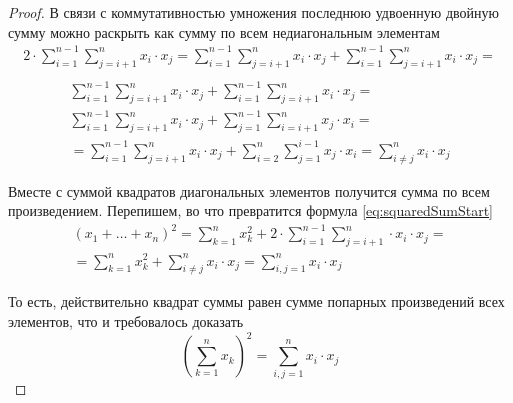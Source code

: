 \begin{proof}
    В связи с коммутативностью умножения последнюю удвоенную двойную сумму можно
    раскрыть как сумму по всем недиагональным элементам
    \begin{align*}
        2 \cdot \sum_{i=1}^{n-1} \sum_{j=i+1}^n x_i \cdot x_j
            = \sum_{i=1}^{n-1} \sum_{j=i+1}^n x_i \cdot x_j
                + \sum_{i=1}^{n-1} \sum_{j=i+1}^n x_i \cdot x_j = \\
    \end{align*}
    \begin{align*}
            \sum_{i=1}^{n-1} \sum_{j=i+1}^n x_i \cdot x_j
                + \sum_{i=1}^{n-1} \sum_{j=i+1}^n x_i \cdot x_j = \\
            \sum_{i=1}^{n-1} \sum_{j=i+1}^n x_i \cdot x_j
                + \sum_{j=1}^{n-1} \sum_{i=i+1}^n x_j \cdot x_i = \\
            = \sum_{i=1}^{n-1} \sum_{j=i+1}^n x_i \cdot x_j
                + \sum_{i=2}^{n} \sum_{j=1}^{i-1} x_j \cdot x_i
            = \sum_{i \neq j}^{n} x_i \cdot x_j
    \end{align*}

    Вместе с суммой квадратов диагональных элементов получится сумма по всем
    произведением. Перепишем, во что превратится формула
    \eqref{eq:squaredSumStart}
    \begin{align*}
         \left( x_1 + \dots + x_n \right)^2
            = \sum_{k=1}^{n} x_k^2
                + 2 \cdot \sum_{i=1}^{n-1}
                    \sum_{j=i+1}^n \cdot x_i \cdot x_j = \\
            = \sum_{k=1}^{n} x_k^2 + \sum_{i \neq j}^{n} x_i \cdot x_j
            = \sum_{i, j = 1}^{n} x_i \cdot x_j
    \end{align*}

    То есть, действительно квадрат суммы равен сумме попарных произведений всех
    элементов, что и требовалось доказать
    $$\left( \sum_{k=1}^n x_k \right)^2 = \sum_{i, j = 1}^{n} x_i \cdot x_j$$
\end{proof}
